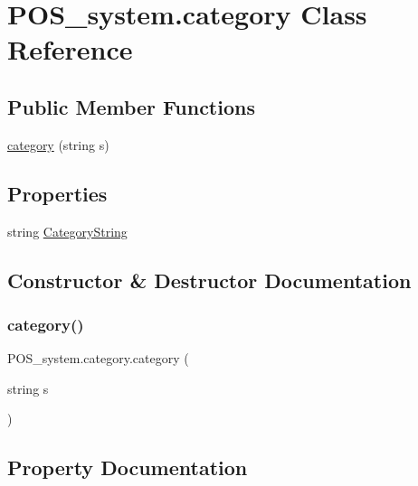 \hypertarget{class_p_o_s__system_1_1category}{}\section{P\+O\+S\+\_\+system.\+category Class Reference}
\label{class_p_o_s__system_1_1category}
\subsection*{Public Member Functions}
\begin{DoxyCompactItemize}
\item 
\mbox{\hyperlink{class_p_o_s__system_1_1category_a6c9fc4c4477e9a8bdb85b73f344d5c1d}{category}} (string s)
\end{DoxyCompactItemize}
\subsection*{Properties}
\begin{DoxyCompactItemize}
\item 
string \mbox{\hyperlink{class_p_o_s__system_1_1category_a0025bf9fbcb37c47014a885c5cd31714}{Category\+String}}
\end{DoxyCompactItemize}


\subsection{Constructor \& Destructor Documentation}
\mbox{\label{class_p_o_s__system_1_1category_a6c9fc4c4477e9a8bdb85b73f344d5c1d}} 
\subsubsection{\texorpdfstring{category()}{category()}}
{\footnotesize\ttfamily P\+O\+S\+\_\+system.\+category.\+category (\begin{DoxyParamCaption}\item[{string}]{s }\end{DoxyParamCaption})}



\subsection{Property Documentation}
\mbox{\label{class_p_o_s__system_1_1category_a0025bf9fbcb37c47014a885c5cd31714}} 
